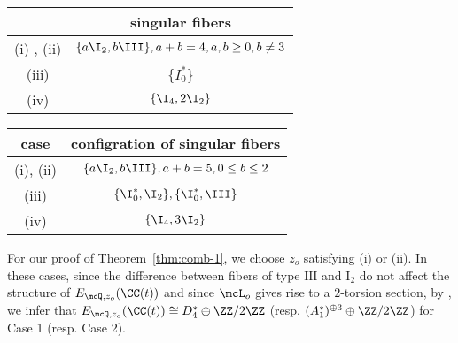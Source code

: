 \begin{center}
\begin{tabular}{|c|c|} \hline
 & singular fibers \\ \hline
(i) , (ii)& $\{ a \I_{2}, b\III \}, a+ b = 4, a, b \ge 0, b \neq 3$ \\ \hline
(iii) & $\{ I_0^{\ast} \}$ \\ \hline
(iv) & $\{ \I_{4}, 2\I_{2} \}$ \\ \hline

\end{tabular}
\end{center}

% 
 

\begin{center}
\begin{tabular}{|c|c|} \hline
case & configration of singular fibers \\ \hline
(i), (ii)  & $\{a\I_2, b\III\}, a+ b = 5, 0 \le b \le 2$ \\ \hline
(iii) & $\{\I_0^*, \I_2\}, \{\I_0^*, \III\}$ \\ \hline
(iv) &  $\{\I_4, 3\I_2\}$ \\ \hline
\end{tabular}
\end{center}

For our proof of Theorem~\ref{thm:comb-1}, we choose  $z_o$ satisfying  (i) or (ii).
In these cases, since 
the difference between fibers of type $\mathrm{III}$ and $\mathrm{I}_{2}$ do not affect the structure of $E_{\mcQ, z_o}(\CC(t))$ and since  
$\mcL_o$ gives rise to a $2$-torsion section, by \cite{oguiso-shioda}, we infer that
 $E_{\mcQ, z_o}(\CC(t)) \cong D_4^{\ast} \oplus
\ZZ/2\ZZ$ (resp. 
 $(A_1^*)^{\oplus 3} \oplus\ZZ/2\ZZ$) for Case 1 (resp.  Case 2).



